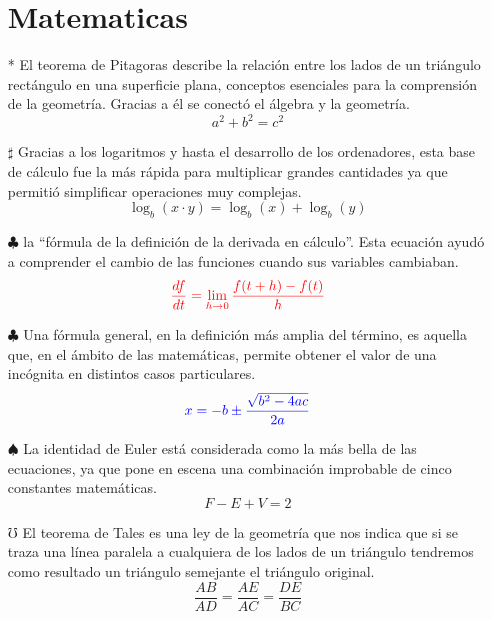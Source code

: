\documentclass[4apaper, 12pt]{article}
\begin{document}
\begin{itemize}
    \section{Matematicas}
    \item [*] El teorema de Pitagoras describe la relación entre los lados de un triángulo rectángulo en una superficie plana, conceptos esenciales para la comprensión de la geometría. Gracias a él se conectó el álgebra y la geometría.
    $$a^2+b^2=c^2$$
    \item[$\sharp$] Gracias a los logaritmos y hasta el desarrollo de los ordenadores, esta base de cálculo fue la más rápida para multiplicar grandes cantidades ya que permitió simplificar operaciones muy complejas.
    \begin{equation*}
        \log_b(x\cdot y)=\log_b(x)+\log_b(y)
    \end{equation*}
     \item[$\clubsuit$]la “fórmula de la definición de la derivada en cálculo”. Esta ecuación ayudó a comprender el cambio de las funciones cuando sus variables cambiaban.
     \begin{equation*}
         \textcolor{red}{\frac{df}{dt}=\lim_{h\rightarrow0}\frac{f(t+h)-f(t)}{h}}
     \end{equation*}
      
    \item[$\clubsuit$] Una fórmula general, en la definición más amplia del término, es aquella que, en el ámbito de las matemáticas, permite obtener el valor de una incógnita en distintos casos particulares.
    \begin{equation*}
        \textcolor{blue}{x=-b\pm\frac{\sqrt{b^2-4ac}}{2a}}
    \end{equation*}
    \item[$\spadesuit$]La identidad de Euler está considerada como la más bella de las ecuaciones, ya que pone en escena una combinación improbable de cinco constantes matemáticas.
    \begin{equation*}
        F-E+V=2
    \end{equation*}
    \item[$\mho$] El teorema de Tales es una ley de la geometría que nos indica que si se traza una línea paralela a cualquiera de los lados de un triángulo tendremos como resultado un triángulo semejante el triángulo original.
    \begin{equation*}
        \frac{AB}{AD}=\frac{AE}{AC}=\frac{DE}{BC}
    \end{equation*}

\end{itemize}
\end{document}
